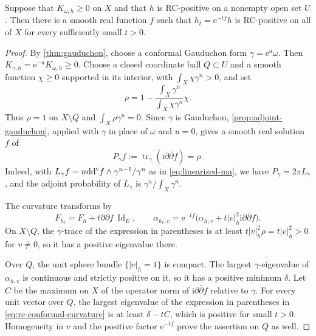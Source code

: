 \begin{theorem}\label{thm:conformal-rc-globalization}
Suppose that $K_{\omega,h}\geq0$ on $X$ and that $h$ is RC-positive on a nonempty open set $U$. Then there is a smooth real function $f$ such that $h_t=\mathrm e^{-tf}h$ is RC-positive on all of $X$ for every sufficiently small $t>0$.
\end{theorem}
\begin{proof}
By \cref{thm:gauduchon}, choose a conformal Gauduchon form $\gamma=\mathrm e^a\omega$. Then $K_{\gamma,h}=\mathrm e^{-a}K_{\omega,h}\geq0$. Choose a closed coordinate ball $Q\subset U$ and a smooth function $\chi\geq0$ supported in its interior, with $\int_X\chi\gamma^n>0$, and set
\[
 \rho=1-\frac{\int_X\gamma^n}{\int_X\chi\gamma^n}\chi.
\]
Thus $\rho=1$ on $X\setminus Q$ and $\int_X\rho\gamma^n=0$. Since $\gamma$ is Gauduchon, \cref{prop:adjoint-gauduchon}, applied with $\gamma$ in place of $\omega$ and $u=0$, gives a smooth real solution $f$ of
\begin{equation}\label{eq:rc-gauduchon-poisson}
 P_\gamma f:=\operatorname{tr}_\gamma(\mathrm i\partial\bar\partial f)=\rho.
\end{equation}
Indeed, with $L_\gamma f=n\mathrm{dd}^{\mathrm{c}} f\wedge\gamma^{n-1}/\gamma^n$ as in \eqref{eq:linearized-ma}, we have $P_\gamma=2\pi L_\gamma$, and the adjoint probability of $L_\gamma$ is $\gamma^n/\int_X\gamma^n$.

The curvature transforms by
\begin{equation}\label{eq:rc-conformal-curvature}
 F_{h_t}=F_h+t\partial\bar\partial f\,\operatorname{Id}_E,
 \qquad
 \alpha_{h_t,v}=\mathrm e^{-tf}
       \bigl(\alpha_{h,v}+t|v|_h^2\mathrm i\partial\bar\partial f\bigr).
\end{equation}
On $X\setminus Q$, the $\gamma$-trace of the expression in parentheses is at least $t|v|_h^2\rho=t|v|_h^2>0$ for $v\ne0$, so it has a positive eigenvalue there.

Over $Q$, the unit sphere bundle $\{|v|_h=1\}$ is compact. The largest $\gamma$-eigenvalue of $\alpha_{h,v}$ is continuous and strictly positive on it, so it has a positive minimum $\delta$. Let $C$ be the maximum on $X$ of the operator norm of $\mathrm i\partial\bar\partial f$ relative to $\gamma$. For every unit vector over $Q$, the largest eigenvalue of the expression in parentheses in \eqref{eq:rc-conformal-curvature} is at least $\delta-tC$, which is positive for small $t>0$. Homogeneity in $v$ and the positive factor $\mathrm e^{-tf}$ prove the assertion on $Q$ as well.
\end{proof}

